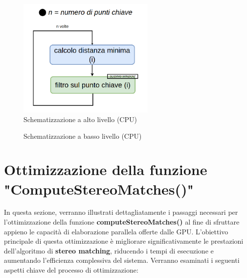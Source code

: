 \documentclass[12pt,a4paper]{report}
\begin{document}
\begin{figure}[H]
    \centering
    \includegraphics[width=0.6\textwidth]{img/sliding_window_high.png}
    \caption{Schematizzazione a alto livello (CPU) }
\end{figure}

\begin{figure}[H] 
    \centering
    \caption{Schematizzazione a basso livello (CPU) }
\end{figure}

\newpage
\section{Ottimizzazione della funzione "ComputeStereoMatches()" } \label{ottimizzazione-computeStereo}

In questa sezione, verranno illustrati dettagliatamente i passaggi necessari per l'ottimizzazione della funzione \textbf{computeStereoMatches()} al fine di sfruttare appieno le capacità di elaborazione parallela offerte dalle GPU. L'obiettivo principale di questa ottimizzazione è migliorare significativamente le prestazioni dell'algoritmo di \textbf{stereo matching}, riducendo i tempi di esecuzione e aumentando l'efficienza complessiva del sistema.
Verranno esaminati i seguenti aspetti chiave del processo di ottimizzazione:
\end{document}

